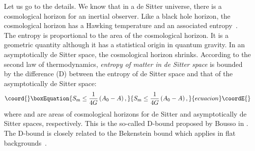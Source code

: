 \documentclass[a4paper,12pt]{article}
\begin{document}
Let us go to the details. We know that in a de Sitter universe,  there is 
a cosmological horizon for an inertial observer. Like a black hole horizon, the 
cosmological horizon has a Hawking temperature and an associated entropy~\cite{GH}. 
The entropy is proportional to the area of the cosmological horizon.
 It is a geometric quantity although it has a 
statistical origin in quantum gravity.
In an asymptotically de Sitter space, the cosmological horizon
shrinks. According to the second law of thermodynamics, {\it
entropy of matter in de Sitter space} is  bounded by the
difference (D) between the entropy of de Sitter space and that of
the asymptotically de Sitter space:
\begin{equation}\coord{}\boxEquation{
\label{2eq10}
  S_{\rm m} \le \frac{1}{4 G}\left( A_0-A\right),
}{
S_{\rm m} \le \frac{1}{4 G}\left( A_0-A\right),
}{ecuacion}\coordE{}\end{equation}
where \coordHE{} and \coordHE{} are areas of cosmological horizons for  de
Sitter and asymptotically de Sitter spaces, respectively. This is
the so-called D-bound proposed by Bousso in \cite{Bousso}. The
D-bound is closely related to the Bekenstein bound which applies in
flat backgrounds~\cite{Bousso,CMO}.
\end{document}
